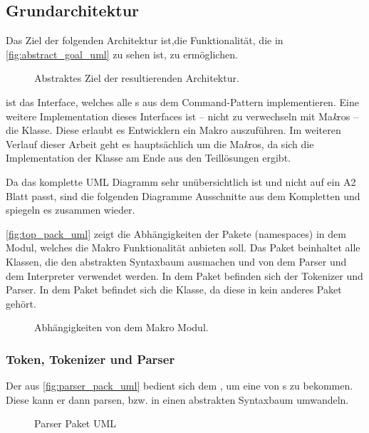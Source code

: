   \subsection{Grundarchitektur}
  \label{ssec:Grundarchitektur}
    Das Ziel der folgenden Architektur ist,die Funktionalität, die in \autoref{fig:abstract_goal_uml} zu sehen ist, zu ermöglichen.

    \begin{figure}[H]
      \centering
      \caption{Abstraktes Ziel der resultierenden Architektur.}
      \label{fig:abstract_goal_uml}
    \end{figure}
     ist das Interface, welches alle s aus dem Command-Pattern implementieren. Eine weitere Implementation dieses Interfaces ist -- nicht zu verwechseln mit Ma\emph{k}ros -- die  Klasse. Diese erlaubt es Entwicklern ein Makro auszuführen. Im weiteren Verlauf dieser Arbeit geht es hauptsächlich um die Ma\emph{k}ros, da sich die Implementation der  Klasse am Ende aus den Teillösungen ergibt.


    Da das komplette UML Diagramm sehr unübersichtlich ist und nicht auf ein A2 Blatt passt, sind die folgenden Diagramme Ausschnitte aus dem Kompletten und spiegeln es zusammen wieder.

    \autoref{fig:top_pack_uml} zeigt die Abhängigkeiten der Pakete (namespaces) in dem Modul, welches die Makro Funktionalität anbieten soll. Das  Paket beinhaltet alle Klassen, die den abstrakten Syntaxbaum ausmachen und von dem Parser und dem Interpreter verwendet werden. In dem  Paket befinden sich der Tokenizer und Parser. In dem  Paket befindet sich die  Klasse, da diese in kein anderes Paket gehört.
    \begin{figure}[H]
      \centering
      \caption{Abhängigkeiten von dem Makro Modul.}
      \label{fig:top_pack_uml}
    \end{figure}

    \subsubsection{Token, Tokenizer und Parser}
    \label{sssec:Token, Tokenizer und Parser}
      Der  aus \autoref{fig:parser_pack_uml} bedient sich dem , um eine  von s zu bekommen. Diese  kann er dann parsen, bzw. in einen abstrakten Syntaxbaum umwandeln.
      \begin{figure}[H]
        \centering
        \caption{Parser Paket UML}
        \label{fig:parser_pack_uml}
      \end{figure}

